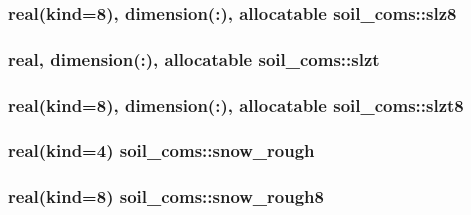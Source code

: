 \subsubsection[{\texorpdfstring{slz8}{slz8}}]{\setlength{\rightskip}{0pt plus 5cm}real(kind=8), dimension(\+:), allocatable soil\+\_\+coms\+::slz8}\hypertarget{namespacesoil__coms_ad701b5cd7609d6ffbd1b800df6a04bb5}{}\label{namespacesoil__coms_ad701b5cd7609d6ffbd1b800df6a04bb5}
\subsubsection[{\texorpdfstring{slzt}{slzt}}]{\setlength{\rightskip}{0pt plus 5cm}real, dimension(\+:), allocatable soil\+\_\+coms\+::slzt}\hypertarget{namespacesoil__coms_a2a9957b4fa1ef14eea11a18d85ba6e3d}{}\label{namespacesoil__coms_a2a9957b4fa1ef14eea11a18d85ba6e3d}
\subsubsection[{\texorpdfstring{slzt8}{slzt8}}]{\setlength{\rightskip}{0pt plus 5cm}real(kind=8), dimension(\+:), allocatable soil\+\_\+coms\+::slzt8}\hypertarget{namespacesoil__coms_a93fd7b06c92beb4d98c9c197b1d7b445}{}\label{namespacesoil__coms_a93fd7b06c92beb4d98c9c197b1d7b445}
\subsubsection[{\texorpdfstring{snow\+\_\+rough}{snow_rough}}]{\setlength{\rightskip}{0pt plus 5cm}real(kind=4) soil\+\_\+coms\+::snow\+\_\+rough}\hypertarget{namespacesoil__coms_a42917920add793523d269a722a3cfa3b}{}\label{namespacesoil__coms_a42917920add793523d269a722a3cfa3b}
\subsubsection[{\texorpdfstring{snow\+\_\+rough8}{snow_rough8}}]{\setlength{\rightskip}{0pt plus 5cm}real(kind=8) soil\+\_\+coms\+::snow\+\_\+rough8}\hypertarget{namespacesoil__coms_a205c07f5f6550972f802f9444dfc934c}{}\label{namespacesoil__coms_a205c07f5f6550972f802f9444dfc934c}

